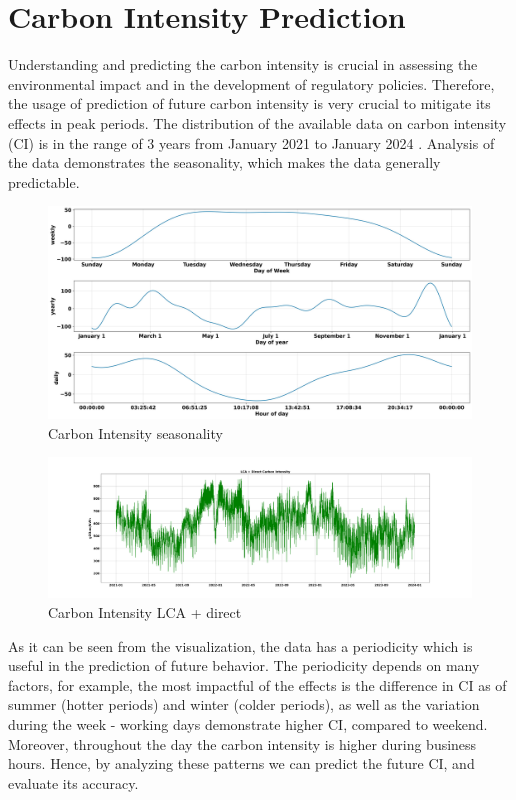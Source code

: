 \section{Carbon Intensity Prediction}
\noindent

Understanding and predicting the carbon intensity is crucial in assessing the environmental impact and in the development of regulatory policies. 
Therefore, the usage of prediction of future carbon intensity is very crucial to mitigate its effects in peak periods. 
The distribution of the available data on carbon intensity (CI) is in the range of 3 years from January 2021 to January 2024 \cite{ElectricityMap}. 
Analysis of the data demonstrates the seasonality, which makes the data generally predictable. 

\begin{figure}[H]
    \centering
    \includegraphics[width=1\textwidth]{Figures/CI_seasonality.jpg}
    \caption{Carbon Intensity seasonality}
    \label{fig:CI_seasonality}
\end{figure}

\begin{figure}[H]
    \centering
    \includegraphics[width=1\textwidth]{Figures/CI_LCA+direct.png}
    \caption{Carbon Intensity LCA + direct}
    \label{fig:CI_LCA+direct}
\end{figure}

As it can be seen from the visualization, the data has a periodicity which is useful in the prediction of future behavior. 
The periodicity depends on many factors, for example, the most impactful of the effects is the difference in CI as of summer (hotter periods) and winter (colder periods), as well as the variation during the week - working days demonstrate higher CI, compared to weekend. 
Moreover, throughout the day the carbon intensity is higher during business hours. 
Hence, by analyzing these patterns we can predict the future CI, and evaluate its accuracy. 

